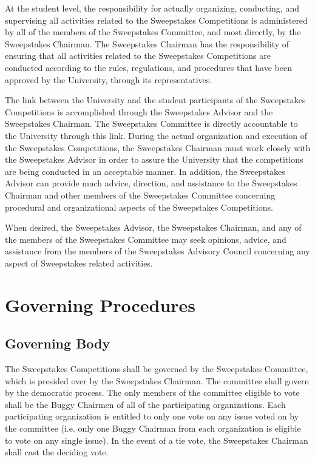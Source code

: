 	At the student level, the responsibility for actually organizing, conducting,
	and supervising all activities related to the Sweepstakes Competitions is
	administered by all of the members of the Sweepstakes Committee, and most
	directly, by the Sweepstakes Chairman. The Sweepstakes Chairman has the
	responsibility of ensuring that all activities related to the Sweepstakes
	Competitions are conducted according to the rules, regulations, and procedures
	that have been approved by the University, through its representatives.

	The link between the University and the student participants of the Sweepstakes
	Competitions is accomplished through the Sweepstakes Advisor and the
	Sweepstakes Chairman. The Sweepstakes Committee is directly accountable to the
	University through this link. During the actual organization and execution of
	the Sweepstakes Competitions, the Sweepstakes Chairman must work closely with
	the Sweepstakes Advisor in order to assure the University that the competitions
	are being conducted in an acceptable manner. In addition, the Sweepstakes
	Advisor can provide much advice, direction, and assistance to the Sweepstakes
	Chairman and other members of the Sweepstakes Committee concerning procedural
	and organizational aspects of the Sweepstakes Competitions.

	When desired, the Sweepstakes Advisor, the Sweepstakes Chairman, and any of the
	members of the Sweepstakes Committee may seek opinions, advice, and assistance
	from the members of the Sweepstakes Advisory Council concerning any aspect of
	Sweepstakes related activities.

\section{Governing Procedures}

\subsection{Governing Body}

	The Sweepstakes Competitions shall be governed by the Sweepstakes Committee,
	which is presided over by the Sweepstakes Chairman. The committee shall govern
	by the democratic process. The only members of the committee eligible to vote
	shall be the Buggy Chairmen of all of the participating organizations. Each
	participating organization is entitled to only one vote on any issue voted on
	by the committee (i.e. only one Buggy Chairman from each organization is
	eligible to vote on any single issue). In the event of a tie vote, the
	Sweepstakes Chairman shall cast the deciding vote.

